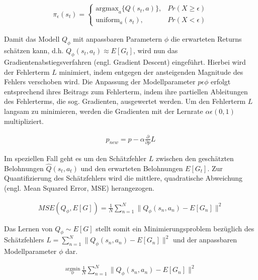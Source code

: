 \begin{equation}
\begin{aligned}
\pi_{\epsilon}(s_t) = \begin{cases}
  \text{argmax}_{a} \{ Q(s_t, a) \}, & Pr(X \ge \epsilon) \\
  \text{uniform}_a(s_t), & Pr(X < \epsilon)
\end{cases}
\end{aligned}
\end{equation}

Damit das Modell $Q_\phi$ mit anpassbaren Parametern $\phi$ die erwarteten Returns
schätzen kann, d.h. $Q_\phi(s_t, a_t) \approx E[G_t]$, wird nun das
Gradientenabstiegsverfahren (engl. Gradient Descent) eingeführt. Hierbei wird der
Fehlerterm $L$ minimiert, indem entgegen der ansteigenden Magnitude des Fehlers verschoben
wird. Die Anpassung der Modellparameter $p \epsilon \phi$ erfolgt entsprechend ihres
Beitrags zum Fehlerterm, indem ihre partiellen Ableitungen des Fehlerterms, die sog. Gradienten,
ausgewertet werden. Um den Fehlerterm $L$ langsam zu minimieren, werden die Gradienten
mit der Lernrate $\alpha \epsilon (0, 1)$ multipliziert.

\begin{equation}
\begin{aligned}
p_{new} = p - \alpha \frac{\partial}{\partial p} L
\end{aligned}
\end{equation}

Im speziellen Fall geht es um den Schätzfehler $L$ zwischen den geschätzten Belohnungen
$\hat{Q}(s_t, a_t)$ und den erwarteten Belohnungen $E[G_t]$. Zur Quantifizierung des
Schätzfehlers wird die mittlere, quadratische Abweichung (engl. Mean Squared Error, MSE)
herangezogen.

\begin{equation}
\begin{aligned}
MSE(Q_\phi, E[G]) = \frac{1}{N} \sum_{n=1}^N \lVert Q_\phi(s_n, a_n) - E[G_n] \rVert^2
\end{aligned}
\end{equation}

Das Lernen von $Q_\phi \sim E[G]$ stellt somit ein Minimierungsproblem bezüglich des
Schätzfehlers $L = \sum_{n=1}^N \lVert Q_\phi(s_n, a_n) - E[G_n] \rVert^2$ und der
anpassbaren Modellparameter $\phi$ dar.

\begin{equation}
\begin{aligned}
\stackrel{\text{argmin}}{{}_\phi} \, \frac{1}{N} \sum_{n=1}^N \lVert Q_\phi(s_n, a_n) - E[G_n] \rVert^2
\end{aligned}
\end{equation}

